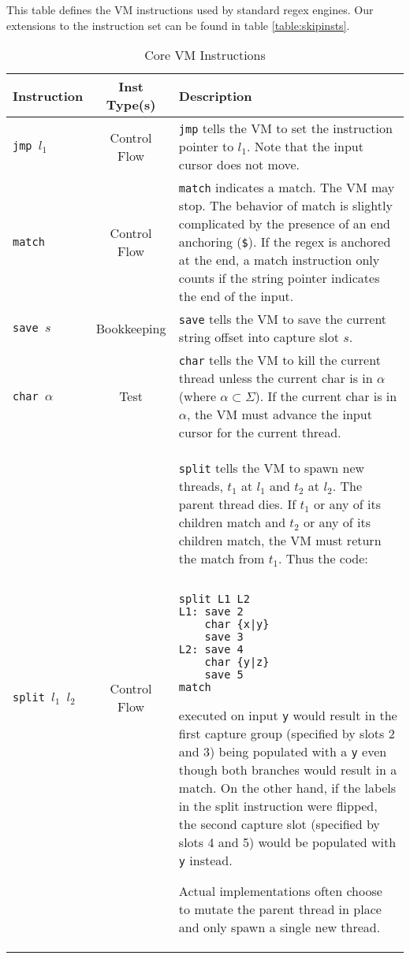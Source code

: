 \begin{table}[ht]
\centering
\caption{Core VM Instructions}
\label{table:insts}

This table defines the VM instructions used by standard regex engines.
Our extensions to the instruction set can be found in table
\ref{table:skipinsts}.
\begin{tabular}{| l | c | p{9cm} |} \hline
Instruction & Inst Type(s) & Description \\ \hline
{\tt jmp $l_1$} & Control Flow &
    \verb'jmp' tells the VM to set the instruction pointer
    to $l_1$. Note that the input cursor does not move. \\ \hline
{\tt match} & Control Flow &
    \verb'match' indicates a match. The VM may stop. The behavior of match
    is slightly complicated by the presence of an end anchoring
    (\verb'$'). If the regex is anchored at the end, a match instruction
    only counts if the string pointer indicates the end of the input.
    \\ \hline
{\tt save $s$} & Bookkeeping &
    \verb'save' tells the VM to save the current string
    offset into capture slot $s$. \\ \hline
{\tt char $\alpha$} & Test &
    \verb'char' tells the VM to kill the current thread unless
    the current char is in $\alpha$ (where $\alpha \subset \Sigma$).
    If the current char is in $\alpha$, the VM must advance the input cursor
    for the current thread. \\ \hline
{\tt split $l_1$ $l_2$} & Control Flow &
    \verb'split' tells the VM to spawn new threads, $t_1$ at $l_1$ 
    and $t_2$ at $l_2$. The parent thread dies.
    If $t_1$ or any of its children match and
    $t_2$ or any of its children match, the VM must return
    the match from $t_1$. Thus the code:
        \begin{verbatim}

split L1 L2
L1: save 2
    char {x|y}
    save 3
L2: save 4
    char {y|z}
    save 5
match
        \end{verbatim}
    executed on input \verb'y' would result in the first capture group
    (specified by slots 2 and 3) being populated with a \verb'y'
    even though both branches would result in a match. On the
    other hand, if the labels in the split instruction were
    flipped, the second capture slot (specified by slots 4 and 5)
    would be populated with \verb'y' instead.

    Actual implementations often choose to mutate the parent thread in
    place and only spawn a single new thread.
    \\ \hline
\end{tabular}
\end{table}

